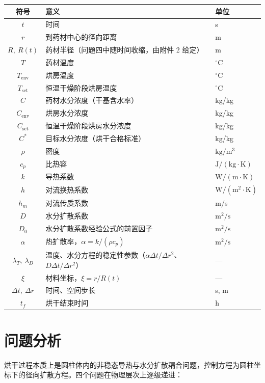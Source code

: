 \documentclass[withoutpreface,bwprint]{cumcmthesis} %
\begin{document}
\begin{center}
\begin{tabular}{cll}
\toprule
符号 & 意义 & 单位 \\
\midrule
$t$ & 时间 & s \\
$r$ & 到药材中心的径向距离 & m \\
$R,\ R(t)$ & 药材半径（问题四中随时间收缩，由附件 2 给定） & m \\
$T$ & 药材温度 & ${}^\circ$C \\
$T_{\mathrm{env}}$ & 烘房温度 & ${}^\circ$C \\
$T_{\mathrm{set}}$ & 恒温干燥阶段烘房温度 & ${}^\circ$C \\
$C$ & 药材水分浓度（干基含水率） & kg/kg \\
$C_{\mathrm{env}}$ & 烘房水分浓度 & kg/kg \\
$C_{\mathrm{set}}$ & 恒温干燥阶段烘房水分浓度 & kg/kg \\
$C^{*}$ & 目标水分浓度（烘干合格标准） & kg/kg \\
$\rho$ & 密度 & $\mathrm{kg/m^3}$ \\
$c_p$ & 比热容 & $\mathrm{J/(kg\cdot K)}$ \\
$k$ & 导热系数 & $\mathrm{W/(m\cdot K)}$ \\
$h$ & 对流换热系数 & $\mathrm{W/(m^2\cdot K)}$ \\
$h_m$ & 对流传质系数 & m/s \\
$D$ & 水分扩散系数 & $\mathrm{m^2/s}$ \\
$D_0$ & 水分扩散系数经验公式的前置因子 & $\mathrm{m^2/s}$ \\
$\alpha$ & 热扩散率，$\alpha=k/(\rho c_p)$ & $\mathrm{m^2/s}$ \\
$\lambda_T,\ \lambda_D$ & 温度、水分方程的稳定性参数（$\alpha\Delta t/\Delta r^2$、$D\Delta t/\Delta r^2$） & — \\
$\xi$ & 材料坐标，$\xi=r/R(t)$ & — \\
$\Delta t,\ \Delta r$ & 时间、空间步长 & s, m \\
$t_f$ & 烘干结束时间 & h \\
\bottomrule
\end{tabular}
\end{center}

\section{问题分析}

烘干过程本质上是圆柱体内的非稳态导热与水分扩散耦合问题，控制方程为圆柱坐标下的径向扩散方程。四个问题在物理层次上逐级递进：
\end{document}
